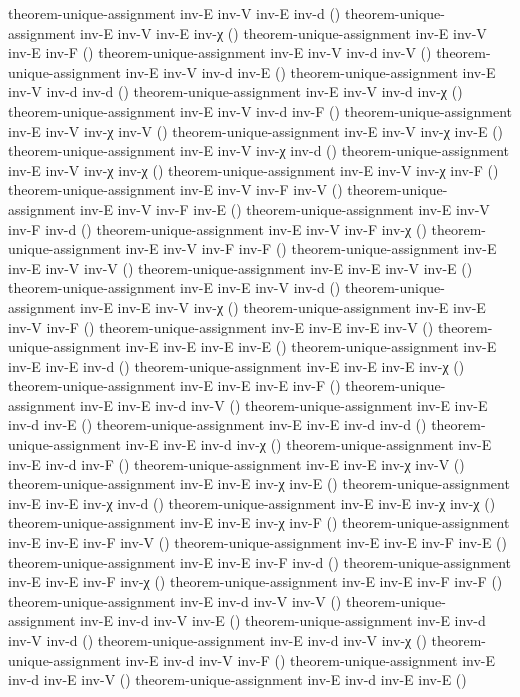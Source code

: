 \documentclass[11pt,a4paper]{article}
\begin{document}
\begin{code}
theorem-unique-assignment inv-E inv-V inv-E inv-d ()
theorem-unique-assignment inv-E inv-V inv-E inv-χ ()
theorem-unique-assignment inv-E inv-V inv-E inv-F ()
theorem-unique-assignment inv-E inv-V inv-d inv-V ()
theorem-unique-assignment inv-E inv-V inv-d inv-E ()
theorem-unique-assignment inv-E inv-V inv-d inv-d ()
theorem-unique-assignment inv-E inv-V inv-d inv-χ ()
theorem-unique-assignment inv-E inv-V inv-d inv-F ()
theorem-unique-assignment inv-E inv-V inv-χ inv-V ()
theorem-unique-assignment inv-E inv-V inv-χ inv-E ()
theorem-unique-assignment inv-E inv-V inv-χ inv-d ()
theorem-unique-assignment inv-E inv-V inv-χ inv-χ ()
theorem-unique-assignment inv-E inv-V inv-χ inv-F ()
theorem-unique-assignment inv-E inv-V inv-F inv-V ()
theorem-unique-assignment inv-E inv-V inv-F inv-E ()
theorem-unique-assignment inv-E inv-V inv-F inv-d ()
theorem-unique-assignment inv-E inv-V inv-F inv-χ ()
theorem-unique-assignment inv-E inv-V inv-F inv-F ()
theorem-unique-assignment inv-E inv-E inv-V inv-V ()
theorem-unique-assignment inv-E inv-E inv-V inv-E ()
theorem-unique-assignment inv-E inv-E inv-V inv-d ()
theorem-unique-assignment inv-E inv-E inv-V inv-χ ()
theorem-unique-assignment inv-E inv-E inv-V inv-F ()
theorem-unique-assignment inv-E inv-E inv-E inv-V ()
theorem-unique-assignment inv-E inv-E inv-E inv-E ()
theorem-unique-assignment inv-E inv-E inv-E inv-d ()
theorem-unique-assignment inv-E inv-E inv-E inv-χ ()
theorem-unique-assignment inv-E inv-E inv-E inv-F ()
theorem-unique-assignment inv-E inv-E inv-d inv-V ()
theorem-unique-assignment inv-E inv-E inv-d inv-E ()
theorem-unique-assignment inv-E inv-E inv-d inv-d ()
theorem-unique-assignment inv-E inv-E inv-d inv-χ ()
theorem-unique-assignment inv-E inv-E inv-d inv-F ()
theorem-unique-assignment inv-E inv-E inv-χ inv-V ()
theorem-unique-assignment inv-E inv-E inv-χ inv-E ()
theorem-unique-assignment inv-E inv-E inv-χ inv-d ()
theorem-unique-assignment inv-E inv-E inv-χ inv-χ ()
theorem-unique-assignment inv-E inv-E inv-χ inv-F ()
theorem-unique-assignment inv-E inv-E inv-F inv-V ()
theorem-unique-assignment inv-E inv-E inv-F inv-E ()
theorem-unique-assignment inv-E inv-E inv-F inv-d ()
theorem-unique-assignment inv-E inv-E inv-F inv-χ ()
theorem-unique-assignment inv-E inv-E inv-F inv-F ()
theorem-unique-assignment inv-E inv-d inv-V inv-V ()
theorem-unique-assignment inv-E inv-d inv-V inv-E ()
theorem-unique-assignment inv-E inv-d inv-V inv-d ()
theorem-unique-assignment inv-E inv-d inv-V inv-χ ()
theorem-unique-assignment inv-E inv-d inv-V inv-F ()
theorem-unique-assignment inv-E inv-d inv-E inv-V ()
theorem-unique-assignment inv-E inv-d inv-E inv-E ()

\end{code}
\end{document}
